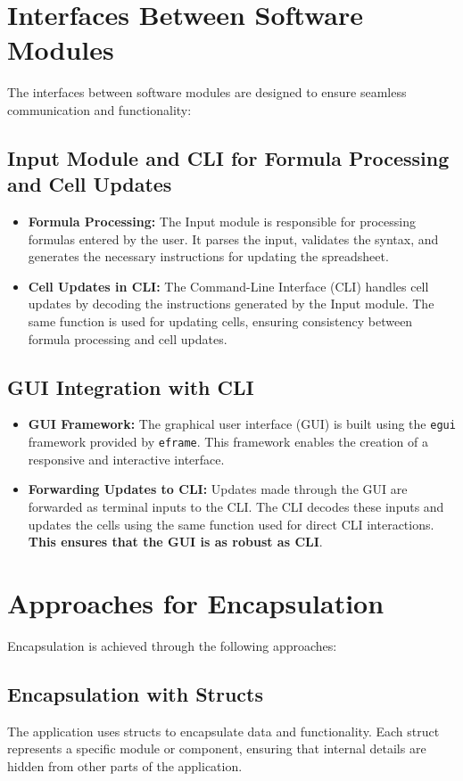 \documentclass{article}
\begin{document}
\section{Interfaces Between Software Modules}
The interfaces between software modules are designed to ensure seamless communication and functionality:

\subsection{Input Module and CLI for Formula Processing and Cell Updates}
\begin{itemize}
    \item \textbf{Formula Processing:} The Input module is responsible for processing formulas entered by the user. It parses the input, validates the syntax, and generates the necessary instructions for updating the spreadsheet.
    \item \textbf{Cell Updates in CLI:} The Command-Line Interface (CLI) handles cell updates by decoding the instructions generated by the Input module. The same function is used for updating cells, ensuring consistency between formula processing and cell updates.
\end{itemize}

\subsection{GUI Integration with CLI}
\begin{itemize}
    \item \textbf{GUI Framework:} The graphical user interface (GUI) is built using the \texttt{egui} framework provided by \texttt{eframe}. This framework enables the creation of a responsive and interactive interface.
    \item \textbf{Forwarding Updates to CLI:} Updates made through the GUI are forwarded as terminal inputs to the CLI. The CLI decodes these inputs and updates the cells using the same function used for direct CLI interactions. \textbf{This ensures that the GUI is as robust as CLI}.
\end{itemize}

\section{Approaches for Encapsulation}
Encapsulation is achieved through the following approaches:

\subsection{Encapsulation with Structs}
The application uses structs to encapsulate data and functionality. Each struct represents a specific module or component, ensuring that internal details are hidden from other parts of the application.
\end{document}
